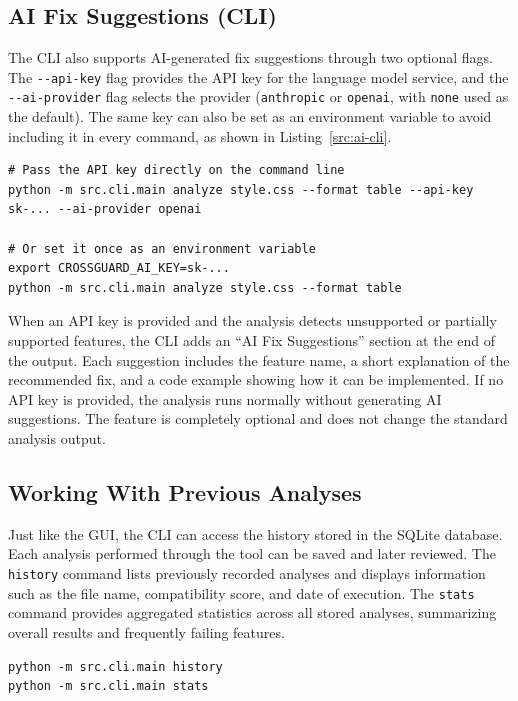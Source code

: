 \subsection{AI Fix Suggestions (CLI)}

The CLI also supports AI-generated fix suggestions through two optional flags. The \texttt{-{}-api-key} flag provides the API key for the language model service, and the \texttt{-{}-ai-provider} flag selects the provider (\texttt{anthropic} or \texttt{openai}, with \texttt{none} used as the default). The same key can also be set as an environment variable to avoid including it in every command, as shown in Listing~\ref{src:ai-cli}.

\begin{lstlisting}[caption={Enable AI fix suggestions via flags or environment variable}, label=src:ai-cli, basicstyle=\ttfamily\small, breaklines=true]
# Pass the API key directly on the command line
python -m src.cli.main analyze style.css --format table --api-key sk-... --ai-provider openai

# Or set it once as an environment variable
export CROSSGUARD_AI_KEY=sk-...
python -m src.cli.main analyze style.css --format table
\end{lstlisting}

When an API key is provided and the analysis detects unsupported or partially supported features, the CLI adds an ``AI Fix Suggestions'' section at the end of the output. Each suggestion includes the feature name, a short explanation of the recommended fix, and a code example showing how it can be implemented. If no API key is provided, the analysis runs normally without generating AI suggestions. The feature is completely optional and does not change the standard analysis output.

\subsection{Working With Previous Analyses}

Just like the GUI, the CLI can access the history stored in the SQLite database. Each analysis performed through the tool can be saved and later reviewed. The \texttt{history} command lists previously recorded analyses and displays information such as the file name, compatibility score, and date of execution. The \texttt{stats} command provides aggregated statistics across all stored analyses, summarizing overall results and frequently failing features.

\begin{lstlisting}[caption={List previous analyses and view aggregated statistics}, basicstyle=\ttfamily\small]
python -m src.cli.main history
python -m src.cli.main stats
\end{lstlisting}

